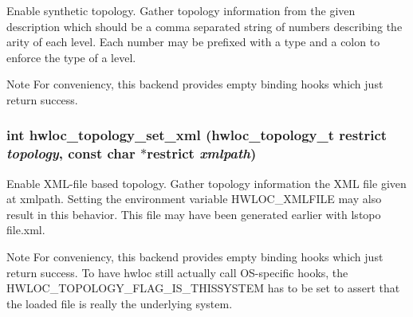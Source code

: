 Enable synthetic topology. Gather topology information from the given {\ttfamily description} which should be a comma separated string of numbers describing the arity of each level. Each number may be prefixed with a type and a colon to enforce the type of a level.

\begin{DoxyNote}{Note}
For conveniency, this backend provides empty binding hooks which just return success. 
\end{DoxyNote}
\hypertarget{group__hwlocality__configuration_ga29b8ebec1b85b324af18fdf5040806bf}{
\subsubsection[{hwloc\_\-topology\_\-set\_\-xml}]{\setlength{\rightskip}{0pt plus 5cm}int hwloc\_\-topology\_\-set\_\-xml ({\bf hwloc\_\-topology\_\-t} restrict {\em topology}, \/  const char $\ast$restrict {\em xmlpath})}}
\label{group__hwlocality__configuration_ga29b8ebec1b85b324af18fdf5040806bf}


Enable XML-\/file based topology. Gather topology information the XML file given at {\ttfamily xmlpath}. Setting the environment variable HWLOC\_\-XMLFILE may also result in this behavior. This file may have been generated earlier with lstopo file.xml.

\begin{DoxyNote}{Note}
For conveniency, this backend provides empty binding hooks which just return success. To have hwloc still actually call OS-\/specific hooks, the HWLOC\_\-TOPOLOGY\_\-FLAG\_\-IS\_\-THISSYSTEM has to be set to assert that the loaded file is really the underlying system. 
\end{DoxyNote}
